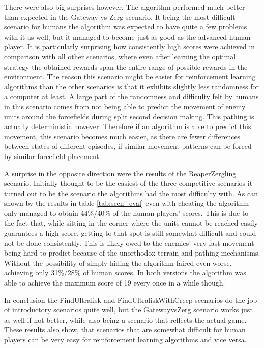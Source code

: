 There were also big surprises however. The algorithm performed much better than expected in the Gateway vs Zerg scenario. It being the most difficult scenario for humans the algorithm was expected to have quite a few problems with it as well, but it managed to become just as good as the advanced human player. It is particularly surprising how consistently high scores were achieved in comparison with all other scenarios, where even after learning the optimal strategy the obtained rewards span the entire range of possible rewards in the environment. The reason this scenario might be easier for reinforcement learning algorithms than the other scenarios is that it exhibits slightly less randomness for a computer at least. A large part of the randomness and difficulty felt by humans in this scenario comes from not being able to predict the movement of enemy units around the forcefields during split second decision making. This pathing is actually deterministic however. Therefore if an algorithm is able to predict this movement, this scenario becomes much easier, as there are fewer differences between states of different episodes, if similar movement patterns can be forced by similar forcefield placement.

A surprise in the opposite direction were the results of the ReaperZergling scenario. Initially thought to be the easiest of the three competitive scenarios it turned out to be the scenario the algorithms had the most difficulty with. As can shown by the results in table \ref{tab:scen_eval} even with cheating the algorithm only managed to obtain 44\%/40\% of the human players' scores. This is due to the fact that, while sitting in the corner where the units cannot be reached easily guarantees a high score, getting to that spot is still somewhat difficult and could not be done consistently. This is likely owed to the enemies' very fast movement being hard to predict because of the unorthodox terrain and pathing mechanisms. Without the possibility of simply hiding the algorithm faired even worse, achieving only 31\%/28\% of human scores. In both versions the algorithm was able to achieve the maximum score of 19 every once in a while though.

In conclusion the FindUltralisk and FindUltraliskWithCreep scenarios do the job of introductory scenarios quite well, but the GatewayvsZerg scenario works just as well if not better, while also being a scenario that reflects the actual game. These results also show, that scenarios that are somewhat difficult for human players can be very easy for reinforcement learning algorithms and vice versa.


